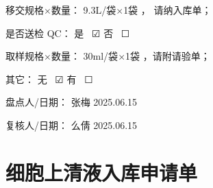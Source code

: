 \documentclass[UTF8,10pt,a4paper,fontset=fandol]{ctexart}
\newcommand{\fieldvalue}[1]{#1}
\newcommand{\handwritten}[1]{#1}
\newcommand{\checkboxfield}[1]{\ifstrequal{#1}{checked}{☑}{\ifstrequal{#1}{unclear}{?}{☐}}}
\begin{document}
\noindent
移交规格$\times$数量：
\fieldvalue{\handwritten{9.3L/袋$\times$1袋}}
， 请纳入库单；

\noindent
是否送检 QC：
是\ 
\fieldvalue{\handwritten{\checkboxfield{checked}}}
\quad 否\ 
\fieldvalue{\checkboxfield{unchecked}}

\noindent
取样规格$\times$数量：
\fieldvalue{\handwritten{30ml/袋$\times$1袋}}
，请附请验单；

\noindent
其它：
无\ 
\fieldvalue{\handwritten{\checkboxfield{checked}}}
\quad 有\ 
\fieldvalue{\checkboxfield{unchecked}}

\noindent
盘点人/日期：
\fieldvalue{\handwritten{张梅}}
\quad
\fieldvalue{\handwritten{2025.06.15}}

\noindent
复核人/日期：
\fieldvalue{\handwritten{么倩}}
\quad
\fieldvalue{\handwritten{2025.06.15}}

\newpage

\section*{细胞上清液入库申请单}
\end{document}
